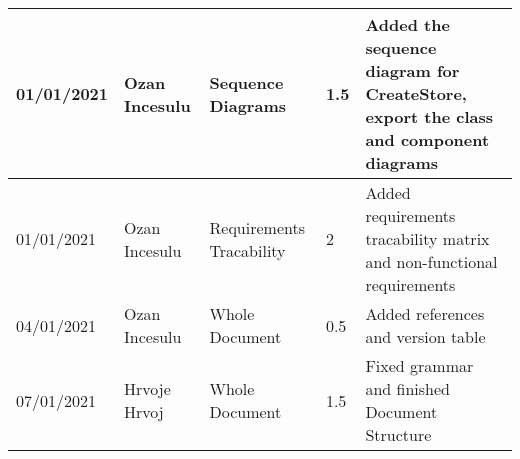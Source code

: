 \newpage
\begin{table}[H]
    \begin{tabular}{|p{2cm}|p{2cm}|p{2.5cm}|p{1.5cm}|p{7.5cm}|}
        \hline

        01/01/2021 & Ozan Incesulu & Sequence Diagrams & 1.5              & Added the sequence diagram for CreateStore, export the class and component diagrams \\ \hline
        01/01/2021 & Ozan Incesulu & Requirements Tracability & 2 & Added requirements tracability matrix and non-functional requirements \\ \hline
        04/01/2021 & Ozan Incesulu & Whole Document & 0.5 & Added references and version table \\ \hline
        07/01/2021 & Hrvoje Hrvoj  & Whole Document & 1.5 & Fixed grammar and finished Document Structure \\ \hline
    \end{tabular}
\end{table}
